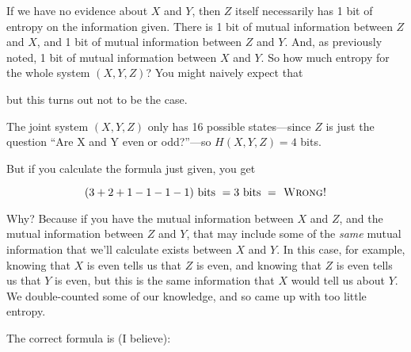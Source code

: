 {
 If we have no evidence about $X$ and $Y$, then $Z$ itself necessarily
has 1 bit of entropy on the information given. There is 1 bit of mutual
information between $Z$ and $X$, and 1 bit of mutual information between $Z$
and $Y$. And, as previously noted, 1 bit of mutual information between $X$
and $Y$. So how much entropy for the whole system $(X,Y,Z)$? You might
naively expect that}


{
 but this turns out not to be the case. }

{
 The joint system $(X,Y,Z)$ only has 16 possible states---since $Z$ is
just the question ``Are X and Y even or
odd?''---so $H(X,Y,Z) = 4$ bits.}

{
 But if you calculate the formula just given, you get}

\begin{equation*}
 (3 + 2 + 1 - 1 - 1 - 1) \text{ bits }= 3\text{ bits }=\textsc{ Wrong!}
\end{equation*}



{
 Why? Because if you have the mutual information between $X$ and $Z$,
and the mutual information between $Z$ and $Y$, that may include some of
the \textit{same} mutual information that we'll
calculate exists between $X$ and $Y$. In this case, for example, knowing
that $X$ is even tells us that $Z$ is even, and knowing that $Z$ is even
tells us that $Y$ is even, but this is the same information that $X$ would
tell us about $Y$. We double-counted some of our knowledge, and so came
up with too little entropy. }

{
 The correct formula is (I believe):}



